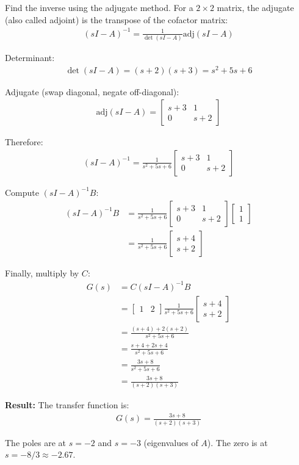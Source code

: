 \documentclass[11pt,a4paper]{article}
\begin{document}
Find the inverse using the adjugate method. For a $2 \times 2$ matrix, the adjugate (also called adjoint) is the transpose of the cofactor matrix:
\begin{align}
  (sI-A)^{-1} = \frac{1}{\det(sI-A)}\text{adj}(sI-A)
\end{align}

Determinant:
\begin{align}
  \det(sI-A) = (s+2)(s+3) = s^2 + 5s + 6
\end{align}

Adjugate (swap diagonal, negate off-diagonal):
\begin{align}
  \text{adj}(sI-A) = \begin{bmatrix} s+3 & 1 \\ 0 & s+2 \end{bmatrix}
\end{align}

Therefore:
\begin{align}
  (sI-A)^{-1} = \frac{1}{s^2+5s+6}\begin{bmatrix} s+3 & 1 \\ 0 & s+2 \end{bmatrix}
\end{align}

Compute $(sI-A)^{-1}B$:
\begin{align}
  (sI-A)^{-1}B &= \frac{1}{s^2+5s+6}\begin{bmatrix} s+3 & 1 \\ 0 & s+2 \end{bmatrix}\begin{bmatrix} 1 \\ 1 \end{bmatrix} \\
  &= \frac{1}{s^2+5s+6}\begin{bmatrix} s+4 \\ s+2 \end{bmatrix}
\end{align}

Finally, multiply by $C$:
\begin{align}
  G(s) &= C(sI-A)^{-1}B \\
  &= \begin{bmatrix} 1 & 2 \end{bmatrix}\frac{1}{s^2+5s+6}\begin{bmatrix} s+4 \\ s+2 \end{bmatrix} \\
  &= \frac{(s+4) + 2(s+2)}{s^2+5s+6} \\
  &= \frac{s+4+2s+4}{s^2+5s+6} \\
  &= \frac{3s+8}{s^2+5s+6} \\
  &= \frac{3s+8}{(s+2)(s+3)}
\end{align}

\textbf{Result:} The transfer function is:
\begin{align}
  G(s) = \frac{3s+8}{(s+2)(s+3)}
\end{align}

The poles are at $s = -2$ and $s = -3$ (eigenvalues of $A$).
The zero is at $s = -8/3 \approx -2.67$.
\end{document}
